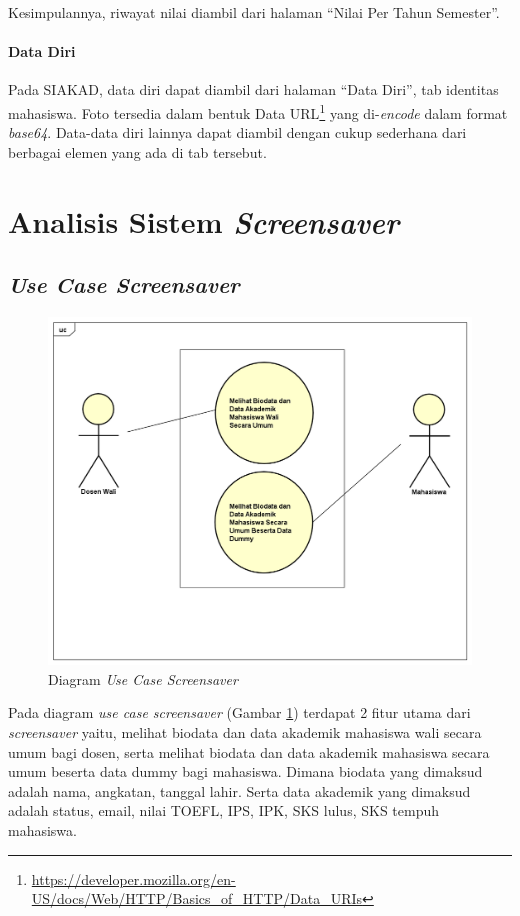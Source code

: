Kesimpulannya, riwayat nilai diambil dari halaman ``Nilai Per Tahun Semester''.

\paragraph{Data Diri} Pada SIAKAD, data diri dapat diambil dari halaman ``Data Diri'', tab identitas mahasiswa. Foto tersedia dalam bentuk Data URL\footnote{\url{https://developer.mozilla.org/en-US/docs/Web/HTTP/Basics_of_HTTP/Data_URIs}} yang di-\textit{encode} dalam format \textit{base64}. Data-data diri lainnya dapat diambil dengan cukup sederhana dari berbagai elemen yang ada di tab tersebut.


\section{Analisis Sistem \textit{Screensaver}}

\subsection{\textit{Use Case Screensaver}}

\begin{figure}[H]
	\centering
	\includegraphics[scale=0.45]{Gambar/UseCase.png}
	\caption{Diagram \textit{Use Case Screensaver}}
	\label{fig:3_usecase_diagram}
\end{figure}
    
Pada diagram \textit{use case screensaver} (Gambar \ref{fig:3_usecase_diagram}) terdapat 2 fitur utama dari \textit{screensaver} yaitu, melihat biodata dan data akademik mahasiswa wali secara umum bagi dosen, serta melihat biodata dan data akademik mahasiswa secara umum beserta data dummy bagi mahasiswa. Dimana biodata yang dimaksud adalah nama, angkatan, tanggal lahir. Serta data akademik yang dimaksud adalah status, email, nilai TOEFL, IPS, IPK, SKS lulus, SKS tempuh mahasiswa.

